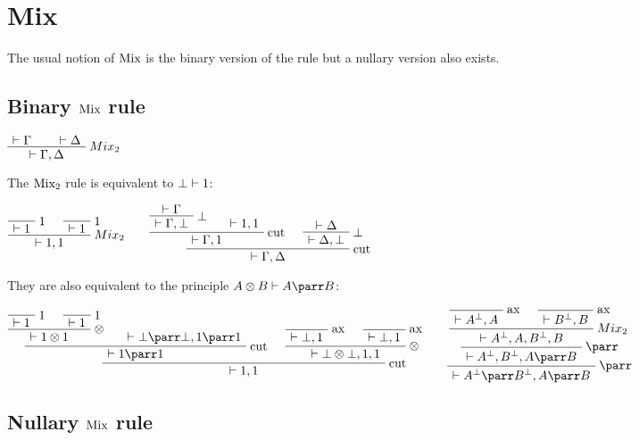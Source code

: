 \section{Mix}\label{mix}

The usual notion of \(\operatorname{Mix}\) is the binary version of the rule
but a nullary version also exists.

\subsection{\texorpdfstring{Binary \(\operatorname{Mix}\) rule}{Binary \textbackslash{}rulename\{Mix\} rule}}\label{binary-rulenamemix-rule}

\(\AxRule{\vdash\Gamma}
\AxRule{\vdash\Delta}
\LabelRule{Mix_2}
\BinRule{\vdash\Gamma,\Delta}
\DisplayProof\)

The \(\operatorname{Mix_2}\) rule is equivalent to \(\bot\vdash1\):

\(\LabelRule{\one}
\NulRule{\vdash\one}
\LabelRule{\one}
\NulRule{\vdash\one}
\LabelRule{Mix_2}
\BinRule{\vdash\one,\one}
\DisplayProof
\qquad
\AxRule{\vdash\Gamma}
\LabelRule{\bot}
\UnaRule{\vdash\Gamma,\bot}
\AxRule{\vdash\one,\one}
\LabelRule{\rulename{cut}}
\BinRule{\vdash\Gamma,\one}
\AxRule{\vdash\Delta}
\LabelRule{\bot}
\UnaRule{\vdash\Delta,\bot}
\LabelRule{\rulename{cut}}
\BinRule{\vdash\Gamma,\Delta}
\DisplayProof\)

They are also equivalent to the principle \(A\tens B \vdash A\parr B\):

\(\LabelRule{\one}
\NulRule{\vdash\one}
\LabelRule{\one}
\NulRule{\vdash\one}
\LabelRule{\tens}
\BinRule{\vdash\one\tens\one}
\AxRule{\vdash\bot\parr\bot,\one\parr\one}
\LabelRule{\rulename{cut}}
\BinRule{\vdash\one\parr\one}
\LabelRule{\rulename{ax}}
\NulRule{\vdash\bot,\one}
\LabelRule{\rulename{ax}}
\NulRule{\vdash\bot,\one}
\LabelRule{\tens}
\BinRule{\vdash\bot\tens\bot,\one,\one}
\LabelRule{\rulename{cut}}
\BinRule{\vdash\one,\one}
\DisplayProof
\qquad
\LabelRule{\rulename{ax}}
\NulRule{\vdash A\orth,A}
\LabelRule{\rulename{ax}}
\NulRule{\vdash B\orth,B}
\LabelRule{Mix_2}
\BinRule{\vdash A\orth,A,B\orth,B}
\LabelRule{\parr}
\UnaRule{\vdash A\orth,B\orth,A\parr B}
\LabelRule{\parr}
\UnaRule{\vdash A\orth\parr B\orth,A\parr B}
\DisplayProof\)

\subsection{\texorpdfstring{Nullary \(\operatorname{Mix}\) rule}{Nullary \textbackslash{}rulename\{Mix\} rule}}\label{nullary-rulenamemix-rule}

